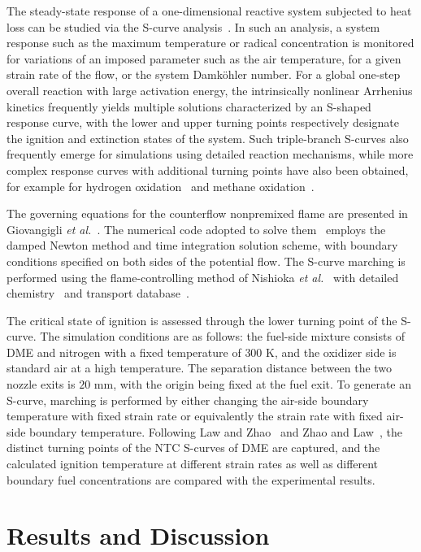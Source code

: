 \documentclass[review,3p,times]{elsarticleUS}
\begin{document}
The steady-state response of a one-dimensional reactive system subjected to heat loss can be studied via the S-curve analysis~\cite{lawbook}. In such an analysis, a system response such as the maximum temperature or radical concentration is monitored for variations of an imposed parameter such as the air temperature, for a given strain rate of the flow, or the system Damk\"ohler number.  For a global one-step overall reaction with large activation energy, the intrinsically nonlinear Arrhenius kinetics frequently yields multiple solutions characterized by an S-shaped response curve, with the lower and upper turning points respectively designate the ignition and extinction states of the system.  Such triple-branch S-curves also frequently emerge for simulations using detailed reaction mechanisms, while more complex response curves with additional turning points have also been obtained, for example for hydrogen oxidation~\cite{kreutz94,fotache98} and methane oxidation~\cite{liu09}. 

The governing equations for the counterflow nonpremixed flame are presented in Giovangigli \emph{et al.}~\cite{giovangigli87}. The numerical code adopted to solve them~\cite{smooke86} employs the damped Newton method and time integration solution scheme, with boundary conditions specified on both sides of the potential flow.  The S-curve marching is performed using the flame-controlling method of Nishioka \emph{et al.}~\cite{nishioka96} with detailed chemistry~\cite{kee89} and transport database~\cite{kee83}.

The critical state of ignition is assessed through the lower turning point of the S-curve.  The simulation conditions are as follows: the fuel-side mixture consists of DME and nitrogen with a fixed temperature of $300$ K, and the oxidizer side is standard air at a high temperature.  The separation distance between the two nozzle exits is $20$ mm, with the origin being fixed at the fuel exit.  To generate an S-curve, marching is performed by either changing the air-side boundary temperature with fixed strain rate or equivalently the strain rate with fixed air-side boundary temperature.  Following Law and Zhao~\cite{law12} and Zhao and Law~\cite{zhao13}, the distinct turning points of the NTC S-curves of DME are captured, and the calculated ignition temperature at different strain rates as well as different boundary fuel concentrations are compared with the experimental results.

\section{Results and Discussion}
\end{document}

